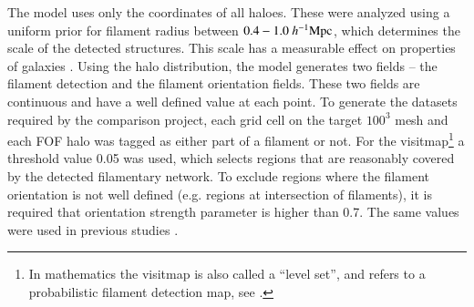 The \bisous{} model uses only the coordinates of all haloes. These were analyzed using a uniform prior for filament radius between $0.4-1.0~h^{-1}\rm Mpc$, which determines the scale of the detected structures. This scale has a measurable effect on properties of galaxies \citep{2015ApJ...800..112G, 2015A&A...576L...5T,2015MNRAS.450.2727T}. Using the halo distribution, the \bisous{} model generates two fields -- the filament detection and the filament orientation fields. These two fields are continuous and have a well defined value at each point. To generate the datasets required by the comparison project, each grid cell on the target $100^3$ mesh and each FOF halo was tagged as either part of a filament or not. For the visitmap\footnote{In mathematics the visitmap is also called a ``level set'', and refers to a probabilistic filament detection map, see \cite{Heinrich:12}.} a threshold value 0.05 was used, which selects regions that are reasonably covered by the detected filamentary network. To exclude regions where the filament orientation is not well defined (e.g. regions at intersection of filaments), it is required that orientation strength parameter is higher than 0.7. The same values were used in previous studies \citep[e.g.][]{2015A&A...583A.142N}.




